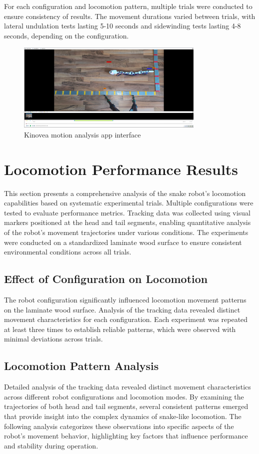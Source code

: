 \documentclass[12pt,a4paper]{report}
\begin{document}
For each configuration and locomotion pattern, multiple trials were conducted to ensure consistency of results. The movement durations varied between trials, with lateral undulation tests lasting 5-10 seconds and sidewinding tests lasting 4-8 seconds, depending on the configuration.

\begin{figure}[H]
\centering
\includegraphics[width=0.8\textwidth]{media/kinovea.png}
\caption{Kinovea motion analysis app interface}
\label{fig:kinovea}
\end{figure}


\section{Locomotion Performance Results}
This section presents a comprehensive analysis of the snake robot's locomotion capabilities based on systematic experimental trials. Multiple configurations were tested to evaluate performance metrics. Tracking data was collected using visual markers positioned at the head and tail segments, enabling quantitative analysis of the robot's movement trajectories under various conditions. The experiments were conducted on a standardized laminate wood surface to ensure consistent environmental conditions across all trials.

\subsection{Effect of Configuration on Locomotion}
The robot configuration significantly influenced locomotion movement patterns on the laminate wood surface. Analysis of the tracking data revealed distinct movement characteristics for each configuration. Each experiment was repeated at least three times to establish reliable patterns, which were observed with minimal deviations across trials.

\subsection{Locomotion Pattern Analysis}
Detailed analysis of the tracking data revealed distinct movement characteristics across different robot configurations and locomotion modes. By examining the trajectories of both head and tail segments, several consistent patterns emerged that provide insight into the complex dynamics of snake-like locomotion. The following analysis categorizes these observations into specific aspects of the robot's movement behavior, highlighting key factors that influence performance and stability during operation.
\end{document}
